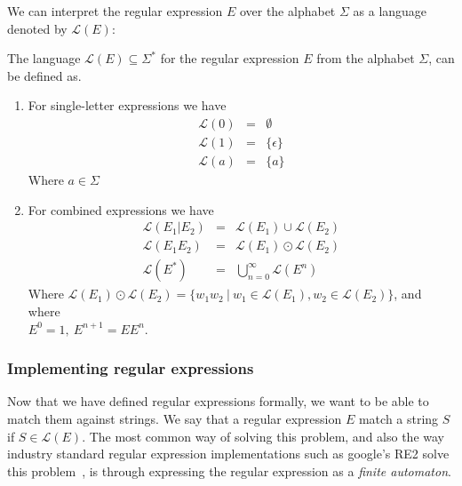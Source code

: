 \documentclass[12pt]{article}
\theoremstyle{definition}
\begin{document}
\newpage

We can interpret the regular expression $E$ over the alphabet $\Sigma$ as a language denoted by $\mathcal{L}(E)$: \\

\begin{definition} The language $\mathcal{L}(E) \subseteq \Sigma^*$ for the regular expression $E$ from the alphabet $\Sigma$, can be defined as.

	\begin{enumerate}
		\item For single-letter expressions we have
			\begin{eqnarray}
				\mathcal{L}(0) &=& \emptyset \\
				\mathcal{L}(1) &=& \{\epsilon\} \\
				\mathcal{L}(a) &=& \{a\}
			\end{eqnarray}
			Where $a \in \Sigma$
			
		\item For combined expressions we have
			\begin{eqnarray}
				\mathcal{L}(E_1|E_2) &=& \mathcal{L}(E_1) \cup \mathcal{L}(E_2) \\
				\mathcal{L}(E_1E_2) &=& \mathcal{L}(E_1) \odot \mathcal{L}(E_2) \\
				\mathcal{L}(E^*) &=& \bigcup^{\infty}_{n = 0}\mathcal{L}(E^n)
			\end{eqnarray}
			Where $\mathcal{L}(E_1) \odot \mathcal{L}(E_2) = \{w_1w_2 \ |\  w_1 \in \mathcal{L}(E_1), w_2 \in \mathcal{L}(E_2)\}$, and where \\
			$E^0 = 1, \ E^{n+1} = EE^n$.
	\end{enumerate}
\end{definition}


\subsubsection{Implementing regular expressions}

Now that we have defined regular expressions formally, we want to be able to match them against strings. We say that a regular expression $E$ match a string $S$ if $S \in \mathcal{L}(E)$.
The most common way of solving this problem, and also the way industry standard regular expression implementations such as google's RE2 solve this problem~\cite{matching-in-the-wild}, is through expressing the regular expression as a \textit{finite automaton}.\\
\end{document}
